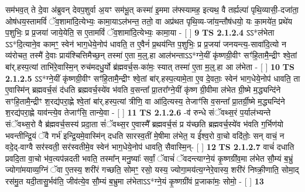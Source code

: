 \documentclass[17pt]{extarticle}
\begin{document}
                  सम॑भव॒त् ते दे॒वा अ॑ब्रुवन् देवप॒शुर्वा अ॒यꣳ सम॑भू॒त् कस्मा॑ इ॒ममा ल॑फ्स्यामह॒ इत्यथ॒ वै तर्ह्यल्पा॑ पृथि॒व्यासी॒-दजा॑ता॒ ओष॑धय॒स्तामविं॑ ॅव॒शामा॑दि॒त्येभ्यः॒ कामा॒याऽल॑भन्त॒ ततो॒ वा अप्र॑थत पृथि॒व्य-जा॑य॒न्तौष॑धयो॒ यः का॒मये॑त॒ प्रथे॑य प॒शुभिः॒ प्र प्र॒जया॑ जाये॒येति॒ स ए॒तामविं॑ ॅव॒शामा॑दि॒त्येभ्यः॒ कामा॒या - [  ] \textbf{  9} \newline
                  \newline
                                \textbf{ TS 2.1.2.4} \newline
                  ऽऽ*ल॑भेता ऽऽ*दि॒त्याने॒व कामꣳ॒॒ स्वेन॑ भाग॒धेये॒नोप॑ धावति॒ त ए॒वैनं॑ प्र॒थय॑न्ति प॒शुभिः॒ प्र प्र॒जया॑ जनयन्त्य॒-सावा॑दि॒त्यो न व्य॑रोचत॒ तस्मै॑ दे॒वाः प्राय॑श्चित्तिमैच्छ॒न् तस्मा॑ ए॒ता म॒ल्॒.हा आल॑भन्ताऽऽ*ग्ने॒यीं कृ॑ष्णग्री॒वीꣳ सꣳ॑हि॒तामै॒न्द्रीꣳ श्वे॒तां बा॑र्.हस्प॒त्यां ताभि॑रे॒वास्मि॒न् रुच॑मदधु॒र्यो ब्र॑ह्मवर्च॒स-का॑मः॒ स्यात् तस्मा॑ ए॒ता म॒॒ल्॒.हा आ ल॑भेता - [  ] \textbf{  10} \newline
                  \newline
                                \textbf{ TS 2.1.2.5} \newline
                  ऽऽ*ग्ने॒यीं कृ॑ष्णग्री॒वीꣳ सꣳ॑हि॒तामै॒न्द्रीꣳ श्वे॒तां बा॑र्.हस्प॒त्यामे॒ता ए॒व दे॒वताः॒ स्वेन॑ भाग॒धेये॒नोप॑ धावति॒ ता ए॒वास्मि॑न् ब्रह्मवर्च॒सं द॑धति ब्रह्मवर्च॒स्ये॑व भ॑वति व॒सन्ता᳚ प्रा॒तरा᳚ग्ने॒यीं कृ॑ष्ण ग्री॒वीमा ल॑भेत ग्री॒ष्मे म॒द्ध्यन्दि॑ने सꣳहि॒तामै॒न्द्रीꣳ श॒रद्य॑परा॒ह्णे श्वे॒तां बा॑र्.हस्प॒त्यां त्रीणि॒ वा आ॑दि॒त्यस्य॒ तेजाꣳ॑सि व॒सन्ता᳚ प्रा॒तर्ग्री॒ष्मे म॒द्ध्यन्दि॑ने श॒रद्य॑परा॒ह्णे याव॑न्त्ये॒व तेजाꣳ॑सि॒ तान्ये॒वा - [  ] \textbf{  11} \newline
                  \newline
                                \textbf{ TS 2.1.2.6} \newline
                  -व॑ रुन्धे संॅवथ्स॒रं प॒र्याल॑भ्यन्ते संॅवथ्स॒रो वै ब्र॑ह्मवर्च॒सस्य॑ प्रदा॒ता सं॑ॅवथ्स॒र ए॒वास्मै᳚ ब्रह्मवर्च॒सं प्र य॑च्छति ब्रह्मवर्च॒स्ये॑व भ॑वति ग॒र्भिण॑यो भवन्तीन्द्रि॒यं ॅवै गर्भ॑ इन्द्रि॒यमे॒वास्मि॑न् दधति सारस्व॒तीं मे॒षीमा ल॑भेत॒ य ई᳚श्व॒रो वा॒चो वदि॑तोः॒ सन् वाचं॒ न वदे॒द्-वाग्वै सर॑स्वती॒ सर॑स्वतीमे॒व स्वेन॑ भाग॒धेये॒नोप॑ धावति॒ सैवास्मि॒न्-  [  ] \textbf{  12} \newline
                  \newline
                                \textbf{ TS 2.1.2.7} \newline
                  वाचं॑ दधाति प्रवदि॒ता वा॒चो भ॑व॒त्यप॑न्नदती भवति॒ तस्मा᳚न् मनु॒ष्याः᳚ सर्वां॒ ॅवाचं॑ ॅवदन्त्याग्ने॒यं कृ॒ष्णग्री॑व॒मा ल॑भेत सौ॒म्यं ब॒भ्रुं ज्योगा॑मयाव्य॒ग्निं ॅवा ए॒तस्य॒ शरी॑रं गच्छति॒ सोमꣳ॒॒ रसो॒ यस्य॒ ज्योगा॒मय॑त्य॒ग्नेरे॒वास्य॒ शरी॑रं निष्क्री॒णाति॒ सोमा॒द् रस॑मु॒त यदी॒तासु॒र्भव॑ति॒ जीव॑त्ये॒व सौ॒म्यं ब॒भ्रुमा ल॑भेताऽऽ*ग्ने॒यं कृ॒ष्णग्री॑वं प्र॒जाका॑मः॒ सोमो॒ - [  ] \textbf{  13} \newline
\end{document}
